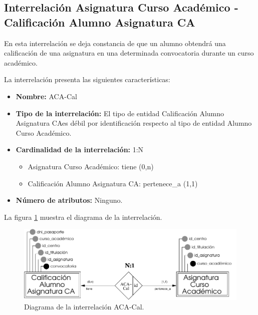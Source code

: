 \subsection{Interrelación Asignatura Curso Académico - Calificación Alumno
            Asignatura CA}

   \begin{description}
      \item[Definición] En esta interrelación se deja constancia de que un
      alumno obtendrá una calificación de una asignatura en una determinada
      convocatoria durante un curso académico.

      \item[Características] La interrelación presenta las siguientes
                             características:

         \begin{itemize}
            \item \textbf{Nombre:} ACA-Cal
            \item \textbf{Tipo de la interrelación:} El tipo de entidad
                  Calificación Alumno Asignatura CAes débil por identificación
                  respecto al tipo de entidad Alumno Curso Académico.
            \item \textbf{Cardinalidad de la interrelación:} 1:N
                  \begin{itemize}
                     \item Asignatura Curso Académico: tiene (0,n)
                     \item Calificación Alumno Asignatura CA: pertenece\_a (1,1)
                  \end{itemize}
            \item \textbf{Número de atributos:} Ninguno.
         \end{itemize}

      \item[Diagrama] La figura \ref{diagramaACA-Cal} muestra el diagrama de la
                      interrelación.

      \item \begin{figure}[!ht]
            \begin{center}
            \includegraphics[]{07.Modelo_Entidad-Interrelacion/7.3.Analisis_Interrelaciones/diagramas/ACA-Cal.pdf}
            \caption{Diagrama de la interrelación ACA-Cal.}
            \label{diagramaACA-Cal}
            \end{center}
         \end{figure}


\end{description}
